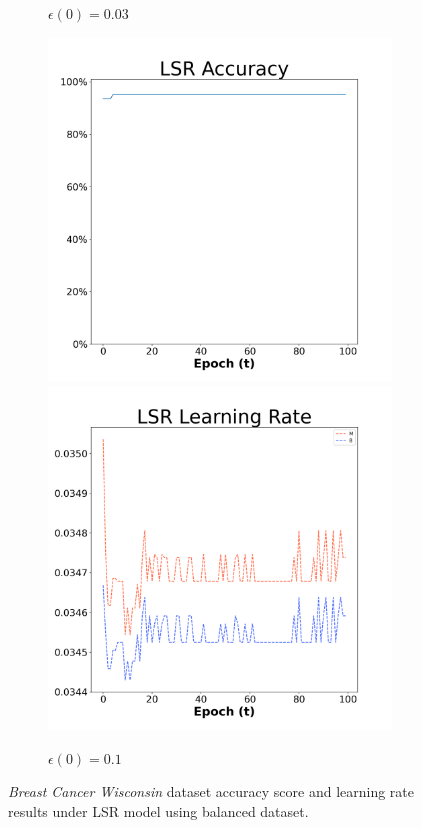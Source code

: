 \begin{figure}[H]
\begin{subfigure}{0.3\textwidth}
  \caption{$\epsilon(0)=0.03$}
\end{subfigure}\hfil %
\begin{subfigure}{0.3\textwidth}
  \includegraphics[width=\linewidth]{images/exper1/breast/LSR_0.1_acc.png}
  \includegraphics[width=\linewidth]{images/exper1/breast/LSR_0.1_lr.png}
  \caption{$\epsilon(0)=0.1$}
\end{subfigure}

\caption{\textit{Breast Cancer Wisconsin} dataset accuracy score and learning rate results under LSR model using balanced dataset.}
\end{figure}

